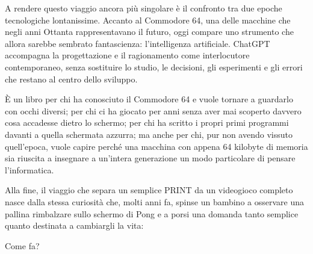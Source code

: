 \documentclass{article}
\begin{document}
A rendere questo viaggio ancora più singolare è il confronto tra due epoche tecnologiche lontanissime. Accanto al
Commodore 64, una delle macchine che negli anni Ottanta rappresentavano il futuro, oggi compare uno strumento che
allora sarebbe sembrato fantascienza: l'intelligenza artificiale. ChatGPT accompagna la progettazione e il ragionamento
come interlocutore contemporaneo, senza sostituire lo studio, le decisioni, gli esperimenti e gli errori che restano al
centro dello sviluppo.

È un libro per chi ha conosciuto il Commodore 64 e vuole tornare a guardarlo con occhi diversi; per chi ci ha giocato
per anni senza aver mai scoperto davvero cosa accadesse dietro lo schermo; per chi ha scritto i propri primi programmi
davanti a quella schermata azzurra; ma anche per chi, pur non avendo vissuto quell'epoca, vuole capire perché una
macchina con appena 64 kilobyte di memoria sia riuscita a insegnare a un'intera generazione un modo particolare di
pensare l'informatica.

Alla fine, il viaggio che separa un semplice PRINT da un videogioco completo nasce dalla stessa curiosità che, molti
anni fa, spinse un bambino a osservare una pallina rimbalzare sullo schermo di Pong e a porsi una domanda tanto
semplice quanto destinata a cambiargli la vita:

Come fa?


\bigskip
\end{document}
